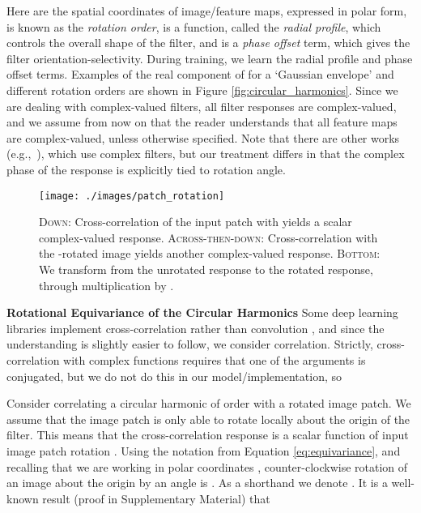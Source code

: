 \documentclass[10pt,twocolumn,letterpaper]{article}
\begin{document}
Here  are the spatial coordinates of image/feature maps, expressed in polar form,  is known as the \emph{rotation order},  is a function, called the \emph{radial profile}, which controls the overall shape of the filter, and  is a \emph{phase offset} term, which gives the filter orientation-selectivity. During training, we learn the radial profile and phase offset terms. Examples of the real component of  for a `Gaussian envelope' and different rotation orders are shown in Figure \ref{fig:circular_harmonics}. Since we are dealing with complex-valued filters, all filter responses are complex-valued, and we assume from now on that the reader understands that all feature maps are complex-valued, unless otherwise specified. Note that there are other works (e.g.,\ \cite{tygert2016complex}), which use complex filters, but our treatment differs in that the complex phase of the response is explicitly tied to rotation angle.
\begin{figure}[t]
	\texttt{[image: ./images/patch\_rotation]}
    \caption{\textsc{Down}: Cross-correlation of the input patch with  yields a scalar complex-valued response. 
    \textsc{Across-then-down}: Cross-correlation with the -rotated 
    image yields another complex-valued response. \textsc{Bottom}: 
    We transform from the unrotated response to the rotated response, through
    multiplication by .}
    \label{fig:commutativity}
\vspace{-1em}
\end{figure}

\textbf{Rotational Equivariance of the Circular Harmonics}
Some deep learning libraries implement cross-correlation  rather than convolution , and since the understanding is slightly easier to follow, we consider correlation. Strictly, cross-correlation with complex functions requires that one of the arguments is conjugated, but we do not do this in our model/implementation, so

Consider correlating a circular harmonic of order  with a rotated image patch. We assume that the image patch is only able to rotate locally about the origin of the filter. This means that the cross-correlation response is a scalar function of input image patch rotation . Using the notation from Equation \ref{eq:equivariance}, and recalling that we are working in polar coordinates , counter-clockwise rotation of an image  about the origin by an angle  is . As a shorthand we denote . It is a well-known result \cite{liu2012equi,freeman1991design} (proof in Supplementary Material) that
\end{document}
